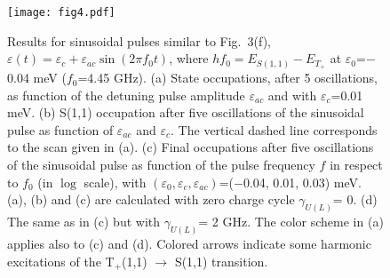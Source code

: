 \documentclass[prb,twocolumn,showpacs,floats]{revtex4}
\begin{document}
\begin{figure}[htbp]
\texttt{[image: fig4.pdf]} 
\caption{
Results for sinusoidal pulses similar to Fig.~3(f),
$\varepsilon(t)=\varepsilon_c+\varepsilon_{ac} \sin (2\pi f_0 t)$, 
where $h f_0 = E_{S(1,1)} - E_{T_+}$ at $\varepsilon_0$=$-$0.04 meV
($f_0$=4.45 GHz).
(a) State occupations, after 5 oscillations, as function of  the detuning pulse amplitude $\varepsilon_{ac}$
and with $\varepsilon_{c}$=0.01 meV.
(b) S(1,1) occupation after five oscillations of the sinusoidal pulse 
 as function of $\varepsilon_{ac}$ and $\varepsilon_{c}$. The vertical dashed line corresponds
 to the scan given in (a).
(c) Final occupations after five oscillations of the sinusoidal pulse as function
of the pulse frequency $f$ in respect to $f_0$ (in $\log$ scale),
with $(\varepsilon_{0},\varepsilon_{c},\varepsilon_{ac})$=($-$0.04, 0.01, 0.03) meV.
(a), (b) and (c) are calculated with zero charge cycle $\gamma_{U(L)}$= 0.
(d) The same as in (c) but with  $\gamma_{U(L)}$= 2 GHz.
The color scheme in (a) applies also to (c) and (d).
Colored arrows indicate some harmonic excitations of the T$_+$(1,1) $\rightarrow$ S(1,1) transition.
} 

\end{figure}
\end{document}
